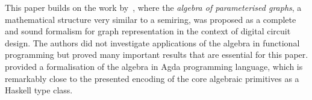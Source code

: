This paper builds on the work by~\citet{2014_algebra_mokhov}, where
the \emph{algebra of parameterised graphs}, a mathematical
structure very similar to a semiring, was proposed as a complete and sound formalism
for graph representation in the context of digital circuit design. The authors did
not investigate applications of the algebra in functional programming but proved
many important results that are essential for this paper.
\citet{2014_alekseyev_phd} provided a formalisation of the algebra in Agda
programming language, which is remarkably close to the presented encoding of the
core algebraic primitives as a Haskell type class.

